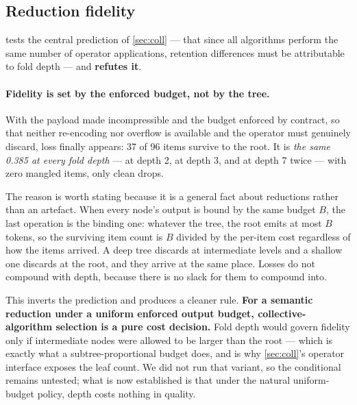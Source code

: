 \documentclass[10pt,twocolumn]{article}
\theoremstyle{definition}
\theoremstyle{plain}
\newcommand{\code}[1]{\texttt{\small #1}}
\begin{document}
\subsection{Reduction fidelity}

\begin{table}[t]
\centering\scriptsize

\caption{Fact retention of a semantic reduction. Each rank contributes a report of
uniquely identified factual items; retention is counted mechanically at the root.
``rank corr.'' is the correlation between a rank's index and the fraction of its
items that survived --- a positional unfairness \code{MPI\_SUM} cannot exhibit.}
\label{tab:fidelity}
\end{table}

 tests the central prediction of \cref{sec:coll} --- that since all
algorithms perform the same number of operator applications, retention differences must
be attributable to fold depth --- and \textbf{refutes it}.

\paragraph{Fidelity is set by the enforced budget, not by the tree.} With the payload made
incompressible and the budget enforced by contract, so that neither re-encoding nor
overflow is available and the operator must genuinely discard, loss finally appears: 37
of 96 items survive to the root. It is \emph{the same 0.385 at every fold depth} --- at
depth 2, at depth 3, and at depth 7 twice --- with zero mangled items, only clean drops.

The reason is worth stating because it is a general fact about reductions rather than an
artefact. When every node's output is bound by the same budget $B$, the last operation is
the binding one: whatever the tree, the root emits at most $B$ tokens, so the surviving
item count is $B$ divided by the per-item cost regardless of how the items arrived. A deep
tree discards at intermediate levels and a shallow one discards at the root, and they
arrive at the same place. Losses do not compound with depth, because there is no slack for
them to compound into.

This inverts the prediction and produces a cleaner rule. \textbf{For a semantic reduction
under a uniform enforced output budget, collective-algorithm selection is a pure cost
decision.} Fold depth would govern fidelity only if intermediate nodes were allowed to be
larger than the root --- which is exactly what a subtree-proportional budget does, and is
why \cref{sec:coll}'s operator interface exposes the leaf count. We did not run that
variant, so the conditional remains untested; what is now established is that under the
natural uniform-budget policy, depth costs nothing in quality.
\end{document}
